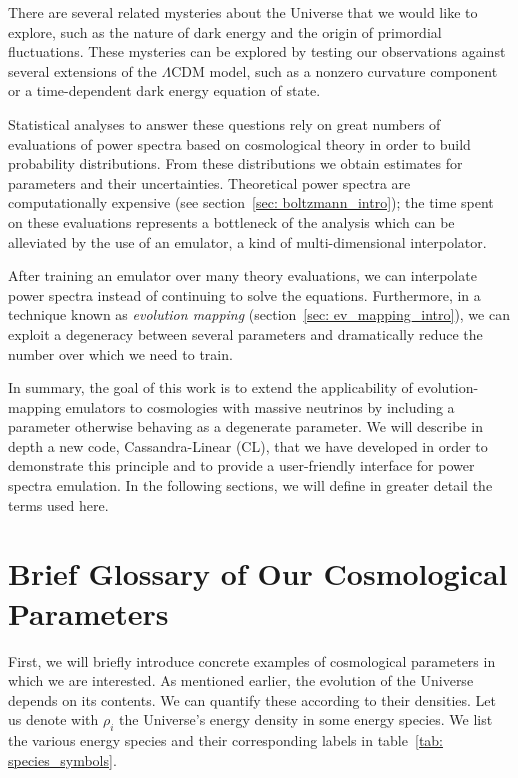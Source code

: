 There are several related mysteries about the Universe that we would like to
explore, such as the nature of dark energy and the origin of primordial
fluctuations. These mysteries can be explored by testing our observations
against several extensions of the $\Lambda$CDM model, such as a nonzero 
curvature component or a time-dependent dark energy equation of state. 

Statistical analyses to answer these questions rely on great numbers of
evaluations of power spectra based on cosmological theory in order to build 
probability 
distributions. From these distributions we obtain estimates for parameters and 
their
uncertainties. Theoretical power spectra are computationally expensive 
(see section~\ref{sec: boltzmann_intro}); the time spent on these evaluations
represents a bottleneck of the analysis which can be alleviated by the
use of an emulator, a kind of multi-dimensional interpolator.

After training an emulator over many theory evaluations, we can interpolate
power spectra instead of continuing to solve the equations. Furthermore, in
a technique known as \textit{evolution mapping}
(section~\ref{sec: ev_mapping_intro}), we can exploit a degeneracy between 
several parameters and dramatically reduce the number over which
we need to train. 

In summary, the goal of this work is to extend the applicability of
evolution-mapping emulators to cosmologies with massive neutrinos by
including a parameter otherwise behaving as a degenerate parameter. We
will describe in depth a new code, Cassandra-Linear (CL), that we have 
developed
in order to demonstrate this principle and to provide a user-friendly
interface for power spectra emulation. In the
following sections, we will define in greater detail the terms used here.

\section{Brief Glossary of Our Cosmological Parameters}
\label{sec: param_glossary}


First, we will briefly introduce concrete
examples of cosmological parameters in which we are interested. As mentioned 
earlier, the evolution of the Universe depends on its contents.
We can quantify these according to their densities. Let us denote with
$\rho_i$ the Universe's energy density in some energy species. We list the 
various energy species and their corresponding labels in
table~\ref{tab: species_symbols}.

